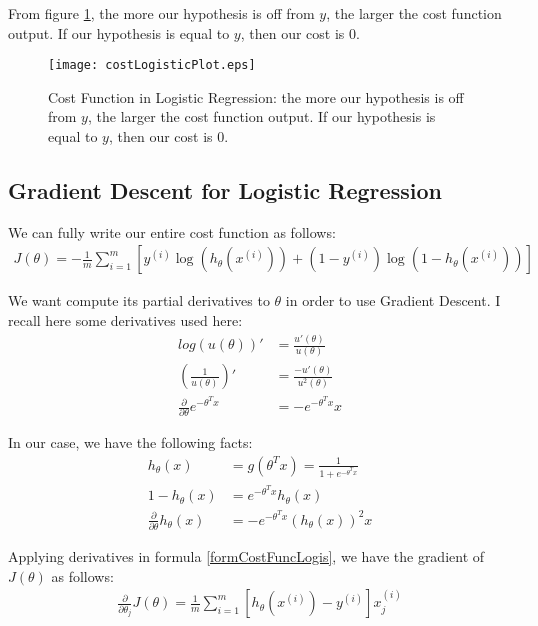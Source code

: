 From figure \ref{figCostLogisticPlot}, the more our hypothesis is off from $y$, the larger the cost function output. If our hypothesis is equal to $y$, then our cost is $0$.
\begin{figure}[!ht]
\centering
\texttt{[image: costLogisticPlot.eps]}
\caption[Cost Function in Logistic Regression]{Cost Function in Logistic Regression: the more our hypothesis is off from $y$, the larger the cost function output. If our hypothesis is equal to $y$, then our cost is $0$.}
\label{figCostLogisticPlot}
\end{figure}

\subsection{Gradient Descent for Logistic Regression}
We can fully write our entire cost function as follows:
\begin{align}\label{formCostFuncLogis}
J(\theta) = - \frac{1}{m} \sum_{i=1}^m [y^{(i)}\log (h_\theta (x^{(i)})) + (1 - y^{(i)})\log (1 - h_\theta(x^{(i)}))]
\end{align}

We want compute its partial derivatives to $\theta$ in order to use Gradient Descent. I recall here some derivatives used here:
\begin{align}
log(u(\theta))' 								&= \frac{u'(\theta)}{u(\theta)} \\
(\frac{1}{u(\theta)})' 							&= \frac{-u'(\theta)}{u^2(\theta)} \\
\frac{\partial}{\partial \theta} e^{-\theta^Tx} &= -e^{-\theta^Tx}x
\end{align}  

In our case, we have the following facts:
\begin{align}
h_\theta(x) 									&= g(\theta^Tx) = \frac{1}{1 + e^{-\theta^Tx}} \\
1 - h_\theta(x) 	&= e^{-\theta^Tx}h_\theta(x) \\
\frac{\partial}{\partial \theta} h_\theta(x) 	&= -e^{-\theta^Tx}(h_\theta(x))^2 x
\end{align}

Applying derivatives in formula \eqref{formCostFuncLogis}, we have the gradient of $J(\theta)$ as follows:
\begin{align*} 
\frac{\partial}{\partial \theta_j} J(\theta) = \frac{1}{m}\sum_{i=1}^m \left [ h_\theta(x^{(i)}) - y^{(i)} \right ] x^{(i)}_j
\end{align*}

